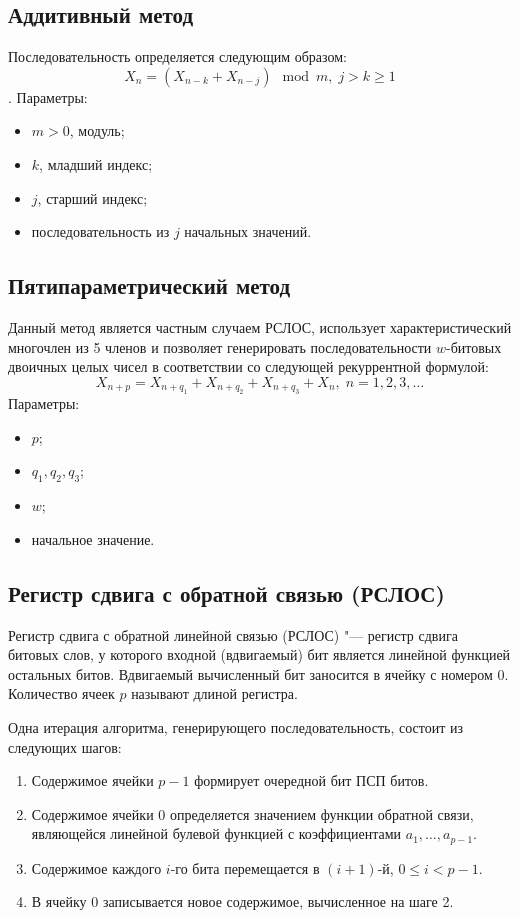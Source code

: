 \documentclass[bachelor, och, labwork]{SCWorks}
\begin{document}
\subsection{Аддитивный метод}
Последовательность определяется следующим образом:
\[ X_n = (X_{n - k} + X_{n - j}) \mod m, \; j > k \geq 1 \].
Параметры:
\begin{itemize}
  \item $m > 0$, модуль;
  \item $k$, младший индекс;
  \item $j$, старший индекс;
  \item последовательность из $j$ начальных значений.
\end{itemize}

\subsection{Пятипараметрический метод}
Данный метод является частным случаем РСЛОС, использует характеристический многочлен из 5 членов и позволяет генерировать последовательности $w$-битовых двоичных целых чисел в соответствии со следующей рекуррентной 
формулой:
\[ X_{n + p} = X_{n + q_1} + X_{n + q_2} + X_{n + q_3} + X_n, \; n = 1, 2, 3, \dots \]
Параметры:
\begin{itemize}
  \item $p$;
  \item $q_1, q_2, q_3$;
  \item $w$;
  \item начальное значение.
\end{itemize}

\subsection{Регистр сдвига с обратной связью (РСЛОС)}
Регистр сдвига с обратной линейной связью (РСЛОС) "--- регистр сдвига битовых слов, у которого входной (вдвигаемый) бит является линейной функцией остальных битов. Вдвигаемый вычисленный бит заносится в 
ячейку с номером 0. Количество ячеек $p$ называют длиной регистра.

Одна итерация алгоритма, генерирующего последовательность, состоит 
из следующих шагов:
\begin{enumerate}
  \item Содержимое ячейки $p - 1$ формирует очередной бит ПСП битов.
  \item Содержимое ячейки 0 определяется значением функции обратной связи, 
  являющейся линейной булевой функцией с коэффициентами $a_1, \dots, a_{p - 1}$.
  \item Содержимое каждого $i$-го бита перемещается в $(i + 1)$-й, $0 \leq i < p - 1$. 
  \item В ячейку 0 записывается новое содержимое, вычисленное на шаге 2.
\end{enumerate}
\end{document}
